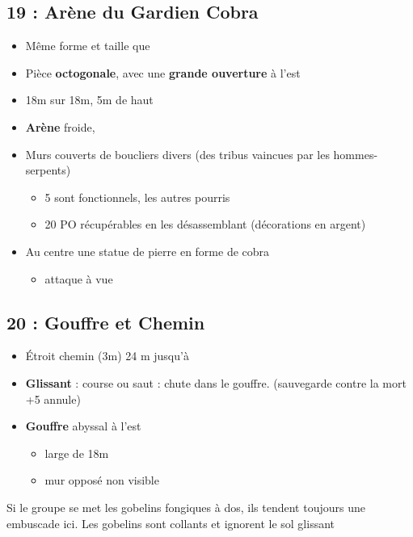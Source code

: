 \vfill

\subsection{19 : Arène du Gardien Cobra}\label{n2:s19}
\begin{itemize}
    \item Même forme et taille que 
    \item Pièce \textbf{octogonale}, avec une \textbf{grande ouverture} à l'est
    \item 18m sur 18m, 5m de haut
    \item \textbf{Arène} froide,
    \item Murs couverts de boucliers divers (des tribus vaincues par les hommes-serpents)
    \begin{itemize}
      \item 5 sont fonctionnels, les autres pourris
      \item 20 PO récupérables en les désassemblant (décorations en argent)
    \end{itemize}
    \item Au centre une statue de pierre en forme de cobra 
    \begin{itemize}
      \item \textbf{} attaque à vue
    \end{itemize}
\end{itemize}

\subsection{20 : Gouffre et Chemin}\label{n2:s20}
\begin{itemize}
  \item \'Etroit chemin (3m) 24 m jusqu'à \textbf{}
  \item \textbf{Glissant} : course ou saut : chute dans le gouffre.
  (sauvegarde contre la mort +5 annule)
  \item \textbf{Gouffre} abyssal à l'est
  \begin{itemize}
    \item large de 18m
    \item mur opposé non visible
  \end{itemize}
\end{itemize}
Si le groupe se met les gobelins fongiques à dos, ils tendent toujours une embuscade ici. 
Les gobelins sont collants et ignorent le sol glissant

